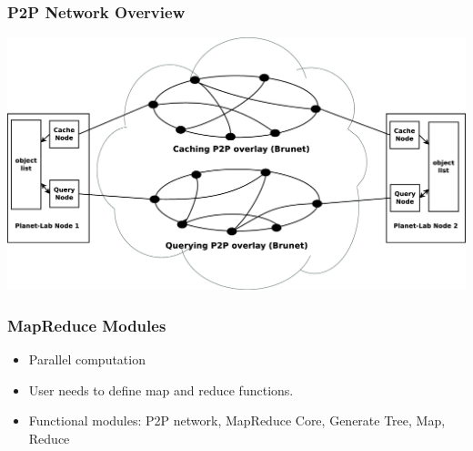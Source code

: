 \documentclass[red]{beamer}
\begin{document}
\begin{frame}
\frametitle{P2P Network Overview}
\begin{center}
\includegraphics[scale=0.17]{figs/brunet}
\end{center}
\end{frame}


\begin{frame}
\frametitle{MapReduce Modules}
\begin{itemize}
\item Parallel computation 
\item User needs to define map and reduce functions.
\item Functional modules: P2P network, MapReduce Core, Generate Tree, Map, Reduce
\end{itemize}
\end{frame}
\end{document}
